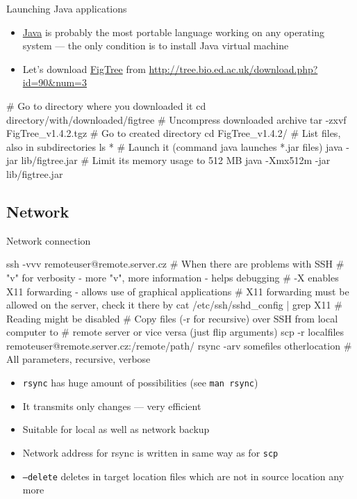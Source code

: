 \documentclass[hyperref={bookmarks=true, unicode=true, colorlinks=true, pdftitle={Linux, command line and MetaCentrum}, plainpages=false, pdfauthor={Vojtech Zeisek}, pdfsubject={Course about use of Linux command line, writing shell scripts and using MetaCentrum of CESNET}, pdfcreator={XeLaTeX, http://www.xelatex.org/}, pdfkeywords={Linux, GNU, BASH, shell, command line, MetaCentrum}, linkcolor=Sienna, anchorcolor=black, citecolor=green, filecolor=magenta, menucolor=Sienna, urlcolor=cyan, pdftex}, compress, ucs, xelatex, xcolor=svgnames, 11pt]{beamer}
\begin{document}
\begin{frame}[fragile]{Launching Java applications}
\begin{itemize}
  \item \href{https://www.java.com/}{Java} is probably the most portable language working on any operating system --- the only condition is to install Java virtual machine
  \item Let's download \href{http://tree.bio.ed.ac.uk/software/figtree/}{FigTree} from \href{http://tree.bio.ed.ac.uk/download.php?id=90&num=3}{http://tree.bio.ed.ac.uk/download.php?id=90\&num=3}
\end{itemize}
  \begin{bashcode}
    # Go to directory where you downloaded it
    cd directory/with/downloaded/figtree
    # Uncompress downloaded archive
    tar -zxvf FigTree_v1.4.2.tgz
    # Go to created directory
    cd FigTree_v1.4.2/
    # List files, also in subdirectories
    ls *
    # Launch it (command java launches *.jar files)
    java -jar lib/figtree.jar
    # Limit its memory usage to 512 MB
    java -Xmx512m -jar lib/figtree.jar
  \end{bashcode}
\end{frame}

\subsection{Network}

\begin{frame}[fragile]{Network connection}
  \begin{bashcode}
    ssh -vvv remoteuser@remote.server.cz # When there are problems with SSH
      # "v" for verbosity - more "v", more information - helps debugging
      # -X enables X11 forwarding - allows use of graphical applications
      # X11 forwarding must be allowed on the server, check it there by
    cat /etc/ssh/sshd_config | grep X11 # Reading might be disabled
    # Copy files (-r for recursive) over SSH from local computer to
    # remote server or vice versa (just flip arguments)
    scp -r localfiles remoteuser@remote.server.cz:/remote/path/
    rsync -arv somefiles otherlocation # All parameters, recursive, verbose
  \end{bashcode}
\begin{itemize}
  \item \texttt{rsync} has huge amount of possibilities (see \texttt{man rsync})
  \item It transmits only changes --- very efficient
  \item Suitable for local as well as network backup
  \item Network address for rsync is written in same way as for \texttt{scp}
  \item \texttt{--delete} deletes in target location files which are not in source location any more
\end{itemize}
\end{frame}
\end{document}
